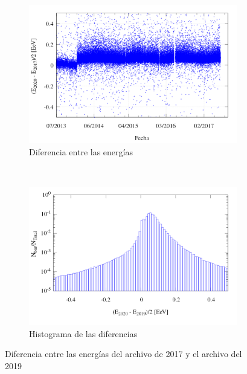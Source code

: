           \begin{figure}[H]
          \centering
            \begin{subfigure}[b]{0.65\textwidth}
              \centering
              \includegraphics[width=\linewidth]{../0_Introduccion/comparacion_deltaE.png}
              \caption{Diferencia entre las energías} \label{fig:deltaE}
            \end{subfigure}\\
            \begin{subfigure}[b]{0.65\textwidth}
              \centering
              \includegraphics[width=\linewidth]{../0_Introduccion/histograma_deltaE.png}
              \caption{Histograma de las diferencias}   \label{fig:histograma}
            \end{subfigure}
            \caption{Diferencia entre las energías del archivo de 2017 y el archivo del 2019}
          \end{figure}

